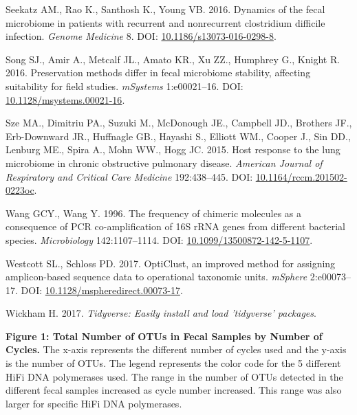 \documentclass[12pt,]{article}
\begin{document}
\hypertarget{ref-erin_seekatz_2016}{}
Seekatz AM., Rao K., Santhosh K., Young VB. 2016. Dynamics of the fecal
microbiome in patients with recurrent and nonrecurrent clostridium
difficile infection. \emph{Genome Medicine} 8. DOI:
\href{https://doi.org/10.1186/s13073-016-0298-8}{10.1186/s13073-016-0298-8}.

\hypertarget{ref-preservation_Song_2016}{}
Song SJ., Amir A., Metcalf JL., Amato KR., Xu ZZ., Humphrey G., Knight
R. 2016. Preservation methods differ in fecal microbiome stability,
affecting suitability for field studies. \emph{mSystems} 1:e00021--16.
DOI:
\href{https://doi.org/10.1128/msystems.00021-16}{10.1128/msystems.00021-16}.

\hypertarget{ref-Sze2015}{}
Sze MA., Dimitriu PA., Suzuki M., McDonough JE., Campbell JD., Brothers
JF., Erb-Downward JR., Huffnagle GB., Hayashi S., Elliott WM., Cooper
J., Sin DD., Lenburg ME., Spira A., Mohn WW., Hogg JC. 2015. Host
response to the lung microbiome in chronic obstructive pulmonary
disease. \emph{American Journal of Respiratory and Critical Care
Medicine} 192:438--445. DOI:
\href{https://doi.org/10.1164/rccm.201502-0223oc}{10.1164/rccm.201502-0223oc}.

\hypertarget{ref-Wang1996}{}
Wang GCY., Wang Y. 1996. The frequency of chimeric molecules as a
consequence of PCR co-amplification of 16S rRNA genes from different
bacterial species. \emph{Microbiology} 142:1107--1114. DOI:
\href{https://doi.org/10.1099/13500872-142-5-1107}{10.1099/13500872-142-5-1107}.

\hypertarget{ref-opticlust_Westcott_2017}{}
Westcott SL., Schloss PD. 2017. OptiClust, an improved method for
assigning amplicon-based sequence data to operational taxonomic units.
\emph{mSphere} 2:e00073--17. DOI:
\href{https://doi.org/10.1128/mspheredirect.00073-17}{10.1128/mspheredirect.00073-17}.

\hypertarget{ref-tidyverse_2017}{}
Wickham H. 2017. \emph{Tidyverse: Easily install and load 'tidyverse'
packages}.

\newpage

\textbf{Figure 1: Total Number of OTUs in Fecal Samples by Number of
Cycles.} The x-axis represents the different number of cycles used and
the y-axis is the number of OTUs. The legend represents the color code
for the 5 different HiFi DNA polymerases used. The range in the number
of OTUs detected in the different fecal samples increased as cycle
number increased. This range was also larger for specific HiFi DNA
polymerases.
\end{document}
